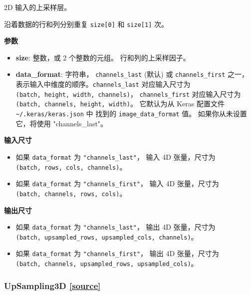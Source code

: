 2D 输入的上采样层。

沿着数据的行和列分别重复 \texttt{size{[}0{]}} 和 \texttt{size{[}1{]}}
次。

\textbf{参数}

\begin{itemize}
\tightlist
\item
  \textbf{size}: 整数，或 2 个整数的元组。 行和列的上采样因子。
\item
  \textbf{data\_format}: 字符串， \texttt{channels\_last} (默认) 或
  \texttt{channels\_first} 之一，
  表示输入中维度的顺序。\texttt{channels\_last} 对应输入尺寸为
  \texttt{(batch,\ height,\ width,\ channels)}，
  \texttt{channels\_first} 对应输入尺寸为
  \texttt{(batch,\ channels,\ height,\ width)}。 它默认为从 Keras
  配置文件 \texttt{\textasciitilde{}/.keras/keras.json} 中 找到的
  \texttt{image\_data\_format} 值。 如果你从未设置它，将使用
  "channels\_last"。
\end{itemize}

\textbf{输入尺寸}

\begin{itemize}
\tightlist
\item
  如果 \texttt{data\_format} 为 \texttt{"channels\_last"}， 输入 4D
  张量，尺寸为 \texttt{(batch,\ rows,\ cols,\ channels)}。
\item
  如果 \texttt{data\_format} 为 \texttt{"channels\_first"}， 输入 4D
  张量，尺寸为 \texttt{(batch,\ channels,\ rows,\ cols)}。
\end{itemize}

\textbf{输出尺寸}

\begin{itemize}
\tightlist
\item
  如果 \texttt{data\_format} 为 \texttt{"channels\_last"}， 输出 4D
  张量，尺寸为
  \texttt{(batch,\ upsampled\_rows,\ upsampled\_cols,\ channels)}。
\item
  如果 \texttt{data\_format} 为 \texttt{"channels\_first"}， 输出 4D
  张量，尺寸为
  \texttt{(batch,\ channels,\ upsampled\_rows,\ upsampled\_cols)}。
\end{itemize}




\subsubsection{UpSampling3D {\href{https://github.com/keras-team/keras/blob/master/keras/layers/convolutional.py\#L1618}{{[}source{]}}}}

\begin{Shaded}
\begin{Highlighting}[]
\OperatorTok{=}\NormalTok{(}\NormalTok{, }\NormalTok{, }\OperatorTok{=}\NormalTok{)}
\end{Highlighting}
\end{Shaded}

